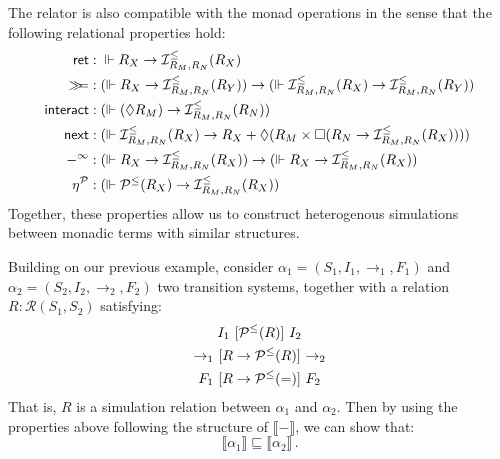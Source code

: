 The relator is also compatible with the monad operations
in the sense that the following relational properties hold:
\begin{align*}
   \mathsf{ret}  &:
    {}\Vdash R_X \rightarrow \mathcal{I}^\le_{R_M,R_N}(R_X) \\
  \gg\!\!= &:
    (\Vdash R_X \rightarrow
     \mathcal{I}^\le_{R_M,R_N}(R_Y)) \rightarrow
    (\Vdash \mathcal{I}^\le_{R_M,R_N}(R_X) \rightarrow
     \mathcal{I}^\le_{R_M,R_N}(R_Y)) \\
   \mathsf{interact}  &:
    (\Vdash (\Diamond R_M) \rightarrow
     \mathcal{I}^\le_{R_M,R_N}(R_N)) \\
   \mathsf{next}  &:
    (\Vdash \mathcal{I}^\le_{R_M,R_N}(R_X) \rightarrow
     R_X +
     \Diamond (R_M \times
     \Box (R_N \rightarrow \mathcal{I}^\le_{R_M,R_N}(R_X)))) \\
  -^\infty &:
    (\Vdash R_X \rightarrow \mathcal{I}^\le_{R_M,R_N}(R_X)) \rightarrow
    (\Vdash R_X \rightarrow \mathcal{I}^\le_{R_M,R_N}(R_X)) \\
  \eta^\mathcal{P} &:
    (\Vdash \mathcal{P}^\le(R_X) \rightarrow
     \mathcal{I}^\le_{R_M,R_N}(R_X))
\end{align*}
Together,
these properties allow us to construct
heterogenous simulations
between monadic terms with similar structures.

\begin{example} \label{ex:sim}
Building on our previous example,
consider
$\alpha_1 = (S_1, I_1, {\rightarrow}_1, F_1)$ and
$\alpha_2 = (S_2, I_2, {\rightarrow}_2, F_2)$
two transition systems,
together with a relation
$R : \mathcal{R}(S_1, S_2)$
satisfying:
\begin{gather*}
  I_1 \ [{\mathcal{P}^\le(R)}]\  I_2 \\
  {\rightarrow}_1 \ [{R \rightarrow \mathcal{P}^\le(R)}]\  {\rightarrow}_2 \\
  F_1 \ [{R \rightarrow \mathcal{P}^\le(=)}]\  F_2
\end{gather*}
That is, $R$ is a simulation relation between $\alpha_1$ and $\alpha_2$.
Then by using the properties above
following the structure of $\llbracket - \rrbracket$,
we can show that:
\[
    \llbracket \alpha_1 \rrbracket \sqsubseteq
    \llbracket \alpha_2 \rrbracket \,.
\]
\end{example}



